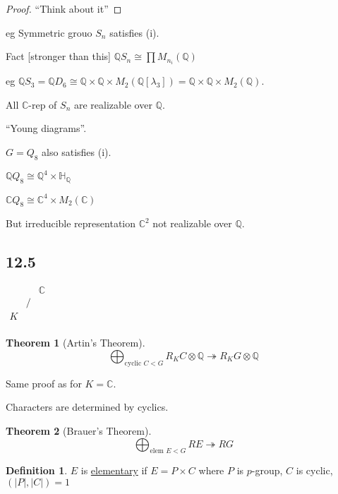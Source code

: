 \documentclass{article}
\theoremstyle{definition}
\newtheorem*{definition}{Definition}
\newtheorem{theorem}{Theorem}
\begin{document}
\begin{proof}
    ``Think about it''
\end{proof}

eg Symmetric grouo \(S_n\) satisfies (i).

Fact [stronger than this] \(\mathbb{Q} S_n \cong \prod M_{n_i} (\mathbb{Q})\) 

eg \(\mathbb{Q} S_3 = \mathbb{Q} D_6 \cong \mathbb{Q} \times \mathbb{Q} \times M_2(\mathbb{Q}[\lambda_3]) = \mathbb{Q} \times \mathbb{Q} \times M_2(\mathbb{Q})\).

All \(\mathbb{C}\)-rep of \(S_n\) are realizable over \(\mathbb{Q}\).

``Young diagrams''.

\(G = Q_8\) also satisfies (i).

\(\mathbb{Q} Q_8 \cong \mathbb{Q}^4 \times \mathbb{H}_\mathbb{Q}\) 

\(\mathbb{C} Q_8 \cong \mathbb{C}^4 \times M_2(\mathbb{C})\)

But irreducible representation \(\mathbb{C}^2\) not realizable over \(\mathbb{Q}\).

\subsection*{12.5}

\(\begin{matrix}
     &  &  \mathbb{C} \\
     & / &   \\
    K &  &   \\
\end{matrix}\) 

\begin{theorem}
    [Artin's Theorem]

    \[
        \bigoplus_{\text{cyclic } C < G} R_K C \otimes \mathbb{Q} \twoheadrightarrow R_K G \otimes \mathbb{Q}
    \]

    Same proof as for \(K = \mathbb{C}\).

    Characters are determined by cyclics.
\end{theorem}

\begin{theorem}
    [Brauer's Theorem]

    \[
        \bigoplus_{\text{elem } E < G} RE \twoheadrightarrow RG
    \]
\end{theorem}

\begin{definition}
    \(E\) is \underline{elementary} if \(E = P \times C\) where \(P\) is \(p\)-group, \(C\) is cyclic, \((\vert P \vert, \vert C \vert) = 1\) 
\end{definition}
\end{document}
